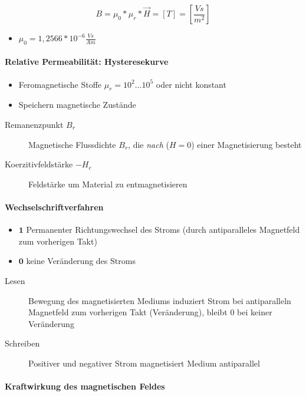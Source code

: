 $$B = \mu_0 * \mu_r * \vec{H} = [T] = \left[\frac{Vs}{m^2}\right]$$

\begin{itemize}
  \item $\mu_0 = 1,2566 * 10^{-6} \frac{Vs}{Am}$
\end{itemize}

\paragraph{Relative Permeabilität: Hysteresekurve}

\begin{itemize}
  \item Feromagnetische Stoffe $\mu_r = 10^2 \dots 10^5$ oder nicht konstant
  \item Speichern magnetische Zustände
\end{itemize}

\begin{description}
  \item[Remanenzpunkt $B_r$] Magnetische Flussdichte $B_r$, die \emph{nach} ($H = 0$) einer Magnetisierung besteht
  \item[Koerzitivfeldstärke $-H_c$] Feldstärke um Material zu entmagnetisieren
\end{description}

\paragraph{Wechselschriftverfahren}

\begin{itemize}
  \item $\mathbf{1}$ Permanenter Richtungswechsel des Stroms (durch antiparalleles Magnetfeld zum vorherigen Takt)
  \item $\mathbf{0}$ keine Veränderung des Stroms
\end{itemize}

\begin{description}
  \item[Lesen] Bewegung des magnetisierten Mediums induziert Strom bei antiparalleln Magnetfeld zum vorherigen Takt (Veränderung), bleibt $0$ bei keiner Veränderung
  \item[Schreiben] Positiver und negativer Strom magnetisiert Medium antiparallel
\end{description}

\paragraph{Kraftwirkung des magnetischen Feldes}

